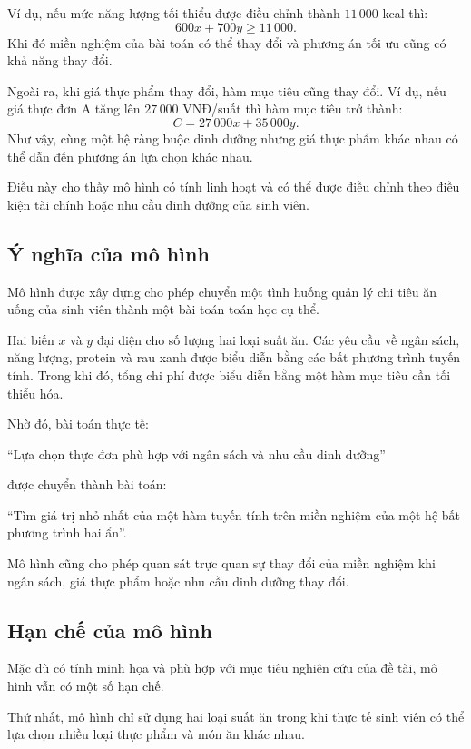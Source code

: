 \documentclass[12pt,a4paper]{article}
\begin{document}
Ví dụ, nếu mức năng lượng tối thiểu được điều chỉnh thành
$11\,000$ kcal thì:
\[
600x+700y\geq11\,000.
\]
Khi đó miền nghiệm của bài toán có thể thay đổi và phương án tối ưu cũng có khả năng thay đổi.

Ngoài ra, khi giá thực phẩm thay đổi, hàm mục tiêu cũng thay đổi. Ví dụ, nếu giá thực đơn A tăng lên $27\,000$ VNĐ/suất thì hàm mục tiêu trở thành:
\[
C=27\,000x+35\,000y.
\]
Như vậy, cùng một hệ ràng buộc dinh dưỡng nhưng giá thực phẩm khác nhau có thể dẫn đến phương án lựa chọn khác nhau.

Điều này cho thấy mô hình có tính linh hoạt và có thể được điều chỉnh theo điều kiện tài chính hoặc nhu cầu dinh dưỡng của sinh viên.

\subsection{Ý nghĩa của mô hình}

Mô hình được xây dựng cho phép chuyển một tình huống quản lý chi tiêu ăn uống của sinh viên thành một bài toán toán học cụ thể.

Hai biến $x$ và $y$ đại diện cho số lượng hai loại suất ăn. Các yêu cầu về ngân sách, năng lượng, protein và rau xanh được biểu diễn bằng các bất phương trình tuyến tính. Trong khi đó, tổng chi phí được biểu diễn bằng một hàm mục tiêu cần tối thiểu hóa.

Nhờ đó, bài toán thực tế:
\begin{center}
``Lựa chọn thực đơn phù hợp với ngân sách và nhu cầu dinh dưỡng''
\end{center}
được chuyển thành bài toán:
\begin{center}
``Tìm giá trị nhỏ nhất của một hàm tuyến tính trên miền nghiệm của một hệ bất phương trình hai ẩn''.
\end{center}
Mô hình cũng cho phép quan sát trực quan sự thay đổi của miền nghiệm khi ngân sách, giá thực phẩm hoặc nhu cầu dinh dưỡng thay đổi.

\subsection{Hạn chế của mô hình}

Mặc dù có tính minh họa và phù hợp với mục tiêu nghiên cứu của đề tài, mô hình vẫn có một số hạn chế.

Thứ nhất, mô hình chỉ sử dụng hai loại suất ăn trong khi thực tế sinh viên có thể lựa chọn nhiều loại thực phẩm và món ăn khác nhau.
\end{document}
